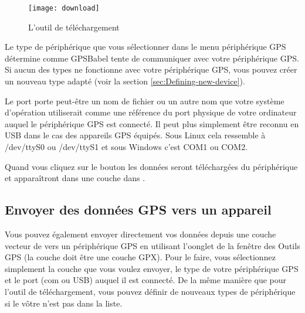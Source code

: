 \begin{figure}[ht]
   \begin{center}
\texttt{[image: download]}
\caption{\label{figure_download}L'outil de téléchargement \nixcaption}
   \end{center}
\end{figure}

Le type de périphérique que vous sélectionner dans le menu périphérique GPS détermine comme GPSBabel tente de communiquer avec votre périphérique GPS.
Si aucun des types ne fonctionne avec votre périphérique GPS, vous pouvez créer un nouveau type adapté (voir la section \ref{sec:Defining-new-device}).

Le port porte peut-être un nom de fichier ou un autre nom que votre système d'opération utiliserait comme une référence du port physique de votre ordinateur auquel le périphérique GPS est connecté. Il peut plus simplement être reconnu en USB dans le cas des appareils GPS équipés.
\nix Sous Linux cela ressemble à /dev/ttyS0 ou /dev/ttyS1  et sous \win Windows c'est COM1 ou COM2.

Quand vous cliquez sur le bouton  les données seront téléchargées du périphérique et apparaîtront dans une couche dans \qg.

\subsection{Envoyer des données GPS vers un appareil}

Vous pouvez également envoyer directement vos données depuis une couche vecteur de \qg vers un périphérique GPS en utilisant l'oonglet  de la fenêtre des Outils GPS (la couche doit être une couche GPX). Pour le faire, vous sélectionnez simplement la couche que vous voulez envoyer, le type de votre périphérique GPS et le port (com ou USB) auquel il est connecté.
De la même manière que pour l'outil de téléchargement, vous pouvez définir de nouveaux types de périphérique si le vôtre n'est pas dans la liste.

